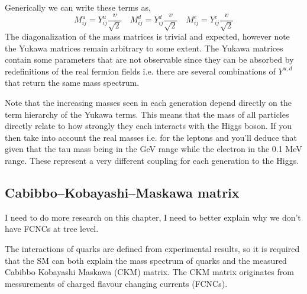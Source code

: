 Generically we can write these terms as,
\begin{equation}
M^u_{ij} = Y^u_{ij} \frac{v}{\sqrt{2}} \quad M^d_{ij} = Y^d_{ij} \frac{v}{\sqrt{2}} \quad M^e_{ij} = Y^e_{ij} \frac{v}{\sqrt{2}}
\end{equation}
The diagonalization of the mass matrices is trivial and expected, however note the Yukawa matrices remain arbitrary to some extent. The Yukawa matrices contain some parameters that are not observable since they can be absorbed by redefinitions of the real fermion fields i.e. there are several combinations of $Y^{u,d}$ that return the same mass spectrum. 

Note that the increasing masses seen in each generation depend directly on the term hierarchy of the Yukawa terms. This means that the mass of all particles directly relate to how strongly they each interacts with the Higgs boson. If you then take into account the real masses i.e. for the leptons and you'll deduce that given that the tau mass being in the GeV range while the electron in the 0.1 MeV range. These represent a very different coupling for each generation to the Higgs.  

\subsection{Cabibbo–Kobayashi–Maskawa matrix}

{ \color{red} I need to do more research on this chapter, I need to better explain why we don't have FCNCs at tree level. }  

The interactions of quarks are defined from experimental results, so it is required that the SM can both explain the mass spectrum of quarks and the measured Cabibbo Kobayashi Maskawa (CKM) matrix. The CKM matrix originates from messurements of charged flavour changing currents (FCNCs).

